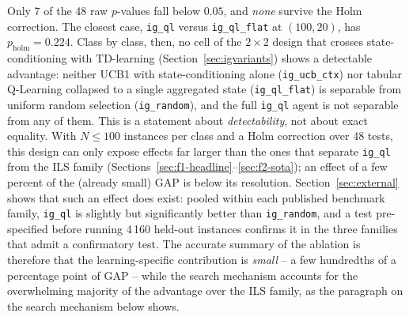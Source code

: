 \documentclass[final,3p,times,11pt,authoryear]{elsarticle}
\begin{document}


Only 7 of the 48 raw $p$-values fall below $0.05$, and \emph{none}
survive the Holm correction. The closest case, \texttt{ig\_ql} versus
\texttt{ig\_ql\_flat} at $(100,20)$, has $p_{\mathrm{holm}} = 0.224$.
Class by class, then, no cell of the $2\times2$ design that crosses
state-conditioning with TD-learning (Section~\ref{sec:igvariants})
shows a detectable advantage: neither UCB1 with state-conditioning
alone (\texttt{ig\_ucb\_ctx}) nor tabular Q-Learning collapsed to a
single aggregated state (\texttt{ig\_ql\_flat}) is separable from
uniform random selection (\texttt{ig\_random}), and the full
\texttt{ig\_ql} agent is not separable from any of them. This is a
statement about \emph{detectability}, not about exact equality. With
$N \le 100$ instances per class and a Holm correction over 48 tests,
this design can only expose effects far larger than the ones that
separate \texttt{ig\_ql} from the ILS family
(Sections~\ref{sec:f1-headline}--\ref{sec:f2-sota}); an effect of a few
percent of the (already small) GAP is below its resolution. Section~\ref{sec:external}
shows that such an effect does exist: pooled within each published
benchmark family, \texttt{ig\_ql} is slightly but significantly better
than \texttt{ig\_random}, and a test pre-specified before running
4\,160 held-out instances confirms it in the three families that
admit a confirmatory test. The accurate summary of the ablation is
therefore that the learning-specific contribution is \emph{small} -- a
few hundredths of a percentage point of GAP -- while the search
mechanism accounts for the overwhelming majority of the advantage over
the ILS family, as the paragraph on the search mechanism below shows.
\end{document}
